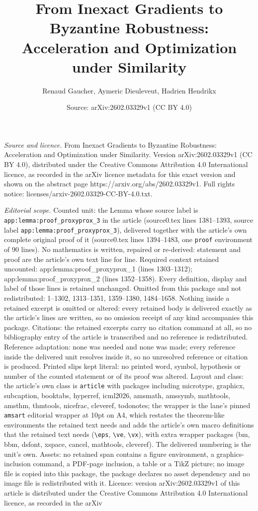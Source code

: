 \documentclass[10pt,a4paper]{amsart}
\title[From Inexact Gradients to Byzantine Robustness: Acceleration]{From Inexact Gradients to Byzantine Robustness: Acceleration and Optimization under Similarity}
\author{Renaud Gaucher, Aymeric Dieuleveut, Hadrien Hendrikx}
\date{Source: arXiv:2602.03329v1 (CC BY 4.0)}
\begin{document}
\maketitle

\noindent\emph{Source and licence.} From Inexact Gradients to Byzantine Robustness: Acceleration and Optimization under Similarity. Version arXiv:2602.03329v1 (CC BY 4.0), distributed under the Creative Commons Attribution 4.0 International licence, as recorded in the arXiv licence metadata for this exact version and shown on the abstract page https://arxiv.org/abs/2602.03329v1. Full rights notice: licenses/arxiv-2602.03329-CC-BY-4.0.txt.\par\smallskip

\noindent\textit{Editorial scope.} Counted unit: the Lemma whose source label is \texttt{app:lemma:proof\_proxyprox\_3} in the article (source0.tex lines 1381--1393, source label \texttt{app:lemma:proof\_proxyprox\_3}), delivered together with the article's own complete original proof of it (source0.tex lines 1394--1483, one \texttt{proof} environment of 90 lines). No mathematics is written, repaired or re-derived: statement and proof are the article's own text line for line. Required context retained uncounted: app:lemma:proof\_proxyprox\_1 (lines 1303--1312); app:lemma:proof\_proxyprox\_2 (lines 1352--1358). Every definition, display and label of those lines is retained unchanged. Omitted from this package and not redistributed: 1--1302, 1313--1351, 1359--1380, 1484--1658. Nothing inside a retained excerpt is omitted or altered: every retained body is delivered exactly as the article's lines are written, so no omission receipt of any kind accompanies this package. Citations: the retained excerpts carry no citation command at all, so no bibliography entry of the article is transcribed and no reference is redistributed. Reference adaptation: none was needed and none was made; every reference inside the delivered unit resolves inside it, so no unresolved reference or citation is produced. Printed slips kept literal: no printed word, symbol, hypothesis or number of the counted statement or of its proof was altered. Layout and class: the article's own class is \texttt{article} with packages including microtype, graphicx, subcaption, booktabs, hyperref, icml2026, amsmath, amssymb, mathtools, amsthm, thmtools, nicefrac, cleveref, todonotes; the wrapper is the lane's pinned \texttt{amsart} editorial wrapper at 10pt on A4, which restates the theorem-like environments the retained text needs and adds the article's own macro definitions that the retained text needs (\texttt{\textbackslash eps}, \texttt{\textbackslash ve}, \texttt{\textbackslash vx}), with extra wrapper packages (bm, bbm, dsfont, xspace, cancel, mathtools, cleveref). The delivered numbering is the unit's own. Assets: no retained span contains a figure environment, a graphics-inclusion command, a PDF-page inclusion, a table or a TikZ picture; no image file is copied into this package, the package declares no asset dependency and no image file is redistributed with it. Licence: version arXiv:2602.03329v1 of this article is distributed under the Creative Commons Attribution 4.0 International licence, as recorded in the arXiv 
\end{document}

